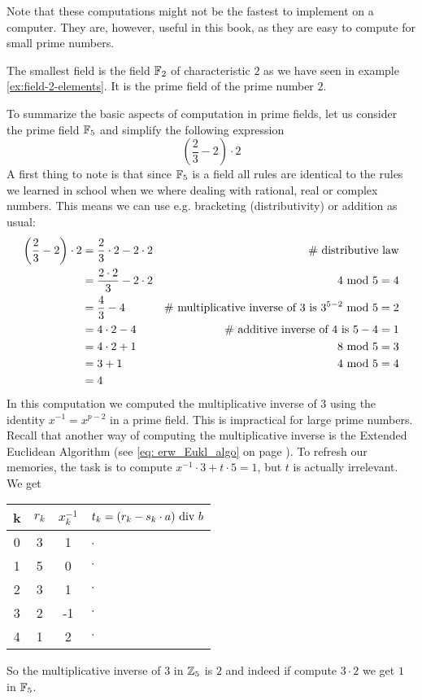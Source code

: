 Note that these computations might not be the fastest to implement on a computer. They are, however, useful in this book, as they are easy to compute for small prime numbers.
\begin{example}
The smallest field is the field $\mathbb{F}_2$ of characteristic $2$ as we have seen in example \ref{ex:field-2-elements}. It is the prime field of the prime number $2$.
\end{example}
\begin{example}
To summarize the basic aspects of computation in prime fields, let us consider the prime field $\mathbb{F}_5$ and simplify the following expression
$$\left(\frac{2}{3} - 2\right)\cdot 2 $$
A first thing to note is that since $\mathbb{F}_5$ is a field all rules are identical to the rules we learned in school when we where dealing with rational, real or complex numbers. This means we can use e.g.  bracketing (distributivity) or addition as usual:
\begin{align*}
\left(\frac{2}{3} - 2\right)\cdot 2 &=
 \frac{2}{3}\cdot 2 - 2\cdot 2 & \text{\# distributive law}\\
 &= \frac{2\cdot 2}{3} - 2\cdot 2 & 4 \text{ mod } 5=4 \\
 &= \frac{4}{3} - 4 & \text{\# multiplicative inverse of 3 is } 3^{5-2} \text{ mod } 5=2\\
 &= 4\cdot 2 - 4 & \text{\# additive inverse of 4 is } 5-4=1\\
 &= 4\cdot 2 +1 & 8 \text{ mod } 5=3\\
 &= 3 +1 & 4 \text{ mod } 5=4\\
 &= 4
\end{align*}
In this computation we computed the multiplicative inverse of $3$ using the identity
$x^{-1}=x^{p-2}$ in a prime field. This is impractical for large prime numbers. Recall that another way of computing the multiplicative inverse is the Extended Euclidean Algorithm (see \ref{eq: erw_Eukl_algo} on page \pageref{eq: erw_Eukl_algo}).  To refresh our memories, the task is to compute $x^{-1}\cdot 3 + t \cdot 5 =1$, but $t$ is actually irrelevant. We get
\begin{center}
  \begin{tabular}{c | c c l}
    k & $ r_k $ & $ x^{-1}_k $ & $ t_k = (r_k-s_k \cdot a) \text{ div } b $ \\\hline
    0 & 3 & 1 & $\cdot$\ \\
    1 & 5 & 0 & $\cdot$ \\
    2 & 3 & 1 & $\cdot$ \\
    3 & 2 &-1 & $\cdot$ \\
    4 & 1 & 2  & $\cdot$ \\
  \end{tabular}
\end{center}
So the multiplicative inverse of $3$ in $\mathbb{Z}_5$ is $2$ and indeed if compute $3\cdot 2$ we get $1$ in $\mathbb{F}_5$.
\end{example}
